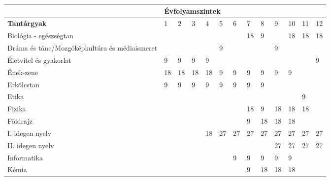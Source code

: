 \begin{landscape}
\begin{table}[]
{\begin{tabular}{l|l|l|l|l|l|l|l|l|l|l|l|l}
                                                        & \multicolumn{12}{l}{\textbf{Évfolyamszintek}}                                                                                                                                                           \\ \hline
    \textbf{Tantárgyak}                                          & 1                                     & 2           & 3           & 4           & 5           & 6           & 7           & 8           & 9           & 10          & 11          & 12          \\ \hline
    Biológia - egészségtan                              &     &     &     &     &     &     & 18  & 9   &     & 18  & 18  & 18  \\\hline
    Dráma és tánc/Mozgóképkultúra és médiaismeret       &     &     &     &     & 9   &     &     &     & 9   &     &     &     \\ \hline
    Életvitel és gyakorlat                              & 9   & 9   & 9   & 9   &     &     &     &     &     &     &     & 9   \\\hline
    Ének-zene                                           & 18  & 18  & 18  & 18  & 9   & 9   & 9   & 9   & 9   & 9   &     &     \\\hline
    Erkölcstan                                          & 9   & 9   & 9   & 9   & 9   & 9   & 9   & 9   &     &     &     &     \\\hline
    Etika                                               &     &     &     &     &     &     &     &     &     &     & 9   &     \\\hline
    Fizika                                              &     &     &     &     &     &     & 18  & 9   & 18  & 18  & 18  &     \\\hline
    Földrajz                                            &     &     &     &     &     &     & 9   & 18  & 18  & 18  &     &     \\\hline
    I. idegen nyelv                                     &     &     &     & 18  & 27  & 27  & 27  & 27  & 27  & 27  & 27  & 27  \\\hline
    II. idegen nyelv                                    &     &     &     &     &     &     &     &     & 27  & 27  & 27  & 27  \\\hline
    Informatika                                         &     &     &     &     &     & 9   & 9   & 9   & 9   & 9   &     &     \\\hline
    Kémia                                               &     &     &     &     &     &     & 9   & 18  & 18  & 18  &     &     \\\hline

\end{tabular}}
\end{table}
\end{landscape}
